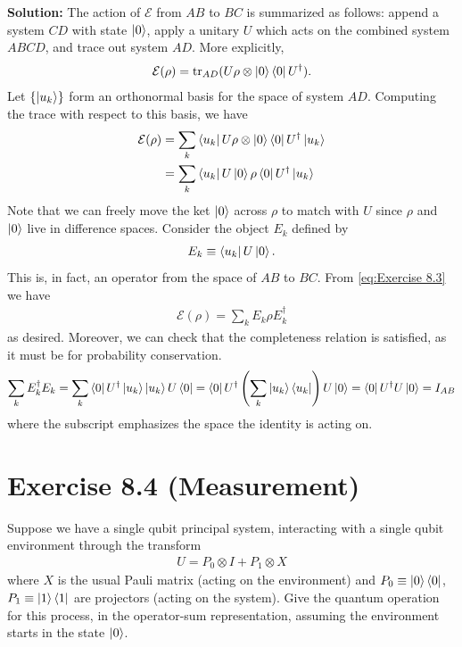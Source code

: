 \documentclass{book}
\newcommand{\mc}[1]{\mathcal{#1}}
\begin{document}
    \textbf{Solution:} The action of $\mc{E}$ from $AB$ to $BC$ is summarized as follows: append a system $CD$ with state $\ket{0}$, apply a unitary $U$ which acts on the combined system $ABCD$, and trace out system $AD$. More explicitly,
    \begin{align}
        \mc{E}(\rho) = \tr_{AD}(U \rho \otimes \ket{0}\bra{0} U^\dagger).
    \end{align}
    Let $\{\ket{u_k}\}$ form an orthonormal basis for the space of system $AD$. Computing the trace with respect to this basis, we have
    \begin{align} \label{eq:Exercise 8.3}
    \begin{aligned}
        \mc{E}(\rho) &= \sum_k \bra{u_k}U \rho \otimes \ket{0}\bra{0}U^\dagger \ket{u_k} \\
        &= \sum_k \bra{u_k}U\ket{0}\rho \bra{0}U^\dagger \ket{u_k}
    \end{aligned}
    \end{align}
    Note that we can freely move the ket $\ket{0}$ across $\rho$ to match with $U$ since $\rho$ and $\ket{0}$ live in difference spaces. Consider the object $E_k$ defined by
    \begin{align}
        E_k \equiv \bra{u_k}U\ket{0}.
    \end{align}
    This is, in fact, an operator from the space of $AB$ to $BC$. From \eqref{eq:Exercise 8.3} we have
    \begin{align}
        \mc{E}(\rho) = \sum_k E_k \rho E_k^\dagger
    \end{align}
    as desired. Moreover, we can check that the completeness relation is satisfied, as it must be for probability conservation.
    \begin{align}
        \sum_k E_k^\dagger E_k = \sum_k \bra{0}U^\dagger \ket{u_k}\ket{u_k}U\bra{0} = \bra{0}U^\dagger \left(\sum_k \ket{u_k}\bra{u_k}\right) U\ket{0} = \bra{0}U^\dagger U \ket{0} = I_{AB}
    \end{align}
    where the subscript emphasizes the space the identity is acting on. 
    
\section*{Exercise 8.4 (Measurement)}
    Suppose we have a single qubit principal system, interacting with a single qubit environment through the transform
    \begin{align}
        U = P_0\otimes I + P_1 \otimes X
    \end{align}
    where $X$ is the usual Pauli matrix (acting on the environment) and $P_0\equiv \ket{0}\bra{0}$, $P_1 \equiv \ket{1}\bra{1}$ are projectors (acting on the system). Give the quantum operation for this process, in the operator-sum representation, assuming the environment starts in the state $\ket{0}$.
    
\end{document}
